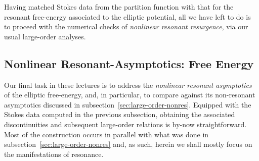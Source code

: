 \documentclass[11pt,a4paper]{article}
\begin{document}
Having matched Stokes data from the partition function with that for the resonant free-energy associated to the elliptic potential, all we have left to do is to proceed with the numerical checks of \textit{nonlinear resonant resurgence}, via our usual large-order analyses.

\subsection{Nonlinear Resonant-Asymptotics: Free Energy}\label{sec:nonlinear-resonance-lo}

Our final task in these lectures is to address the \textit{nonlinear resonant asymptotics} of the elliptic free-energy, and, in particular, to compare against its non-resonant asymptotics discussed in subsection~\ref{sec:large-order-nonres}. Equipped with the Stokes data computed in the previous subsection, obtaining the associated discontinuities and subsequent large-order relations is by-now straightforward. Most of the construction occurs in parallel with what was done in subsection~\ref{sec:large-order-nonres} and, as such, herein we shall mostly focus on the manifestations of resonance.
\end{document}
